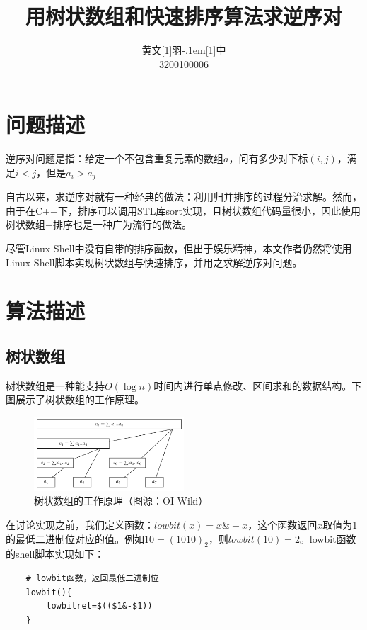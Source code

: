 \documentclass[UTF8]{ctexart}
\title{\textbf{用树状数组和快速排序算法求逆序对}}
\author{\CJKfamily{kai} 黄文\hbox{\scalebox{0.6}[1]{羽}\kern-.1em\scalebox{0.5}[1]{中}}\\3200100006}
\begin{document}
\maketitle

\section{问题描述}

 逆序对问题是指：给定一个不包含重复元素的数组$a$，问有多少对下标$(i,j)$，满足$i<j$，但是$a_i>a_j$

 自古以来，求逆序对就有一种经典的做法：利用归并排序的过程分治求解。然而，由于在C++下，排序可以调用STL库sort实现，且树状数组代码量很小，因此使用树状数组+排序也是一种广为流行的做法。

 尽管Linux Shell中没有自带的排序函数，但出于娱乐精神，本文作者仍然将使用Linux Shell脚本实现树状数组与快速排序，并用之求解逆序对问题。

\section{算法描述}

\subsection{树状数组}

树状数组是一种能支持$O(\log n)$时间内进行单点修改、区间求和的数据结构。下图展示了树状数组的工作原理。

\begin{figure}[H]
    \centering
    \includegraphics[width=0.5\textwidth]{img/bitarray.png}
    \caption{树状数组的工作原理（图源：OI Wiki）}
\end{figure}

在讨论实现之前，我们定义函数：$lowbit(x)=x\&-x$，这个函数返回$x$取值为1的最低二进制位对应的值。例如$10=(1010)_2$，则$lowbit(10)=2$。lowbit函数的shell脚本实现如下：

\begin{verbatim}
    # lowbit函数，返回最低二进制位
    lowbit(){
        lowbitret=$(($1&-$1))
    }
\end{verbatim}
\end{document}
